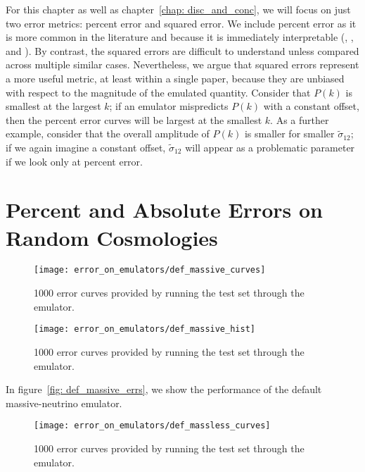 For this chapter as well as chapter~\ref{chap: disc_and_conc}, we will focus
on just two error metrics: percent error and squared error. We include percent
error as it is more common in the literature and because it is immediately
interpretable (\citealp{Mancini}, \citealp{Arico}, and
\citealp{Eggemeier}). By contrast, the squared errors are difficult to
understand unless compared across multiple similar cases.
Nevertheless, we argue
that squared errors represent a more useful metric, at least within a single
paper, because they are unbiased with respect to the magnitude of the emulated
quantity. Consider that $P(k)$ is smallest at the largest $k$; if an emulator
mispredicts $P(k)$ with a constant offset, then the percent error curves will
be largest at the smallest $k$. As a further example, consider that the
overall amplitude of $P(k)$ is smaller for smaller $\tilde{\sigma}_{12}$;
if we again imagine a constant offset, $\tilde{\sigma}_{12}$ will appear as a
problematic parameter if we look only at percent error.


\section{Percent and Absolute Errors on Random Cosmologies}

\begin{figure}[ht!]
  \centering
  \texttt{[image: error\_on\_emulators/def\_massive\_curves]}
  \caption[Default Massive Emulator Error Curves]{1000 error curves provided by running the test set through the emulator.}
  \label{fig: def_massive_curves}
\end{figure}

\begin{figure}[ht!]
  \centering
  \texttt{[image: error\_on\_emulators/def\_massive\_hist]}
  \caption[Default Massive Emulator Error Histograms]{1000 error curves provided by running the test set through the emulator.}
  \label{fig: def_massive_hist}
\end{figure}

In figure~\ref{fig: def_massive_errs}, we show the performance of the default
massive-neutrino emulator. 

\begin{figure}[ht!]
  \centering
  \texttt{[image: error\_on\_emulators/def\_massless\_curves]}
  \caption[Default Massless Emulator Error Curves]{1000 error curves provided by running the test set through the emulator.}
  \label{fig: def_massless_curves}
\end{figure}

